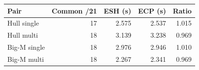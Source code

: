 \begin{tabular}{lrrrr}
\toprule
Pair & Common /21 & ESH (s) & ECP (s) & Ratio \\
\midrule
Hull single & 17 & 2.575 & 2.537 & 1.015 \\
Hull multi & 18 & 3.139 & 3.238 & 0.969 \\
Big-M single & 18 & 2.976 & 2.946 & 1.010 \\
Big-M multi & 18 & 2.267 & 2.341 & 0.969 \\
\bottomrule
\end{tabular}
